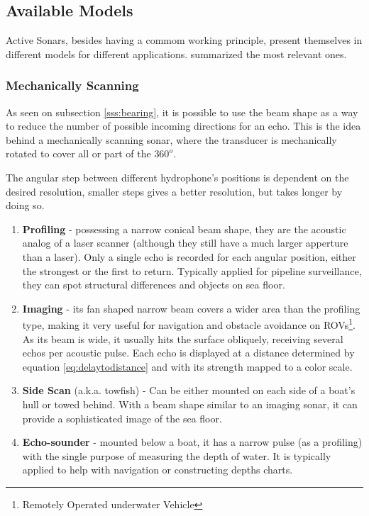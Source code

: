 \subsection{Available Models}
\label{ss:avaible_models}
 
Active Sonars, besides having a commom working principle, present themselves in
different models for different applications. \citet{sonars:16} summarized the
most relevant ones.

\subsubsection{Mechanically Scanning}

As seen on subsection \ref{sss:bearing}, it is possible to use the beam shape as
a way to reduce the number of possible incoming directions for an echo. This is
the idea behind a mechanically scanning sonar, where the transducer is
mechanically rotated to cover all or part of the $360^o$.

The angular step between different hydrophone's positions is dependent on the
desired resolution, smaller steps gives a better resolution, but takes longer
by doing so.

\begin{enumerate}
  \item \textbf{Profiling} - possessing a narrow conical beam shape, they are the
  acoustic analog of a laser scanner (although they still have a much larger
  apperture than a laser). Only a single echo is recorded for each angular
  position, either the strongest or the first to return. Typically applied for
  pipeline surveillance, they can spot structural differences and objects on
  sea floor.
  \item \textbf{Imaging} - its fan shaped narrow beam covers a wider area than
  the profiling type, making it very useful for navigation and obstacle
  avoidance on ROVs\footnote{Remotely Operated underwater Vehicle}. As its beam
  is wide, it usually hits the surface obliquely, receiving several echos per
  acoustic pulse. Each echo is displayed at a distance determined by equation
  \ref{eq:delaytodistance} and with its strength mapped to a color scale.
  \item \textbf{Side Scan} (a.k.a. towfish) - Can be either mounted on each side
  of a boat's hull or towed behind. With a beam shape similar to an imaging
  sonar, it can provide a sophisticated image of the sea floor.
  \item \textbf{Echo-sounder} - mounted below a boat, it has a narrow pulse
  (as a profiling) with the single purpose of measuring the depth of water. It
  is typically applied to help with navigation or constructing depths charts.
\end{enumerate}

